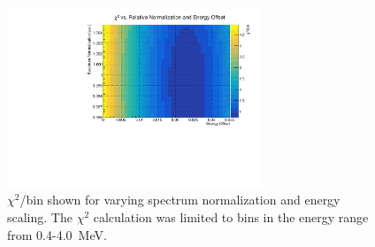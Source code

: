 \begin{figure}[!h]%
	\centering
	\includegraphics[width=0.68\textwidth]{figures/Bi214BetaSpectrumChisq.pdf}
	\caption{\label{fig:BetaE214Chisq}$\chi^2$/bin shown for varying spectrum normalization and energy scaling. The $\chi^2$ calculation was limited to bins in the energy range from 0.4-4.0~MeV.}
\end{figure}



